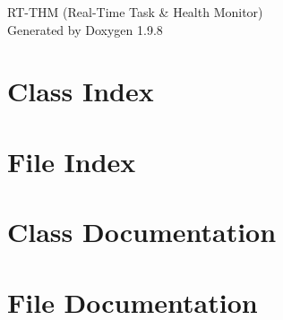 \documentclass[twoside]{book}
\newcommand{\+}{\discretionary{\mbox{\scriptsize$\hookleftarrow$}}{}{}}
\newcommand{\clearemptydoublepage}{%
    \newpage{\pagestyle{empty}\cleardoublepage}%
  }
\begin{document}
  \raggedbottom
    \hypersetup{pageanchor=false,
                bookmarksnumbered=true,
                pdfencoding=unicode
               }
  \begin{titlepage}
  \vspace*{7cm}
  \begin{center}%
  {\Large RT-\/\+THM (\+Real-\/\+Time Task \& Health Monitor)}\\
  \vspace*{1cm}
  {\large Generated by Doxygen 1.9.8}\\
  \end{center}
  \end{titlepage}
  \clearemptydoublepage
  \tableofcontents
  \clearemptydoublepage
  \hypersetup{pageanchor=true}

\chapter{Class Index}

\chapter{File Index}

\chapter{Class Documentation}


\chapter{File Documentation}






















  \backmatter
  \newpage
  \clearemptydoublepage
  \printindex
\end{document}
